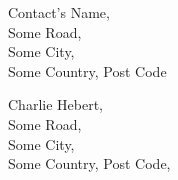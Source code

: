 \begin{multicols}{2}
  \begin{flushleft}
    Contact's Name, \\
    Some Road, \\
    Some City, \\
    Some Country, Post Code
  \end{flushleft}

  \begin{flushright}
    Charlie Hebert, \\
    Some Road, \\
    Some City, \\
    Some Country, Post Code,
  \end {flushright}
\end{multicols}
